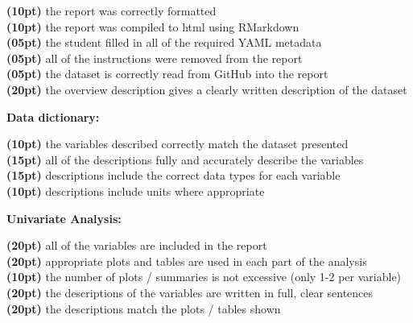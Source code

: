 \documentclass[12pt]{article}
\begin{document}
\underline{\hspace{1cm}} \textbf{(10pt)}
  the report was correctly formatted \\
\underline{\hspace{1cm}} \textbf{(10pt)}
  the report was compiled to html using RMarkdown \\
\underline{\hspace{1cm}} \textbf{(05pt)}
  the student filled in all of the required YAML metadata \\
\underline{\hspace{1cm}} \textbf{(05pt)}
  all of the instructions were removed from the report \\
\underline{\hspace{1cm}} \textbf{(05pt)}
  the dataset is correctly read from GitHub into the report \\
\underline{\hspace{1cm}} \textbf{(20pt)}
  the overview description gives a clearly written description
  of the dataset \\

\medskip

\textbf{Data dictionary:} \vspace{6pt}

\underline{\hspace{1cm}} \textbf{(10pt)}
  the variables described correctly match the dataset presented \\
\underline{\hspace{1cm}} \textbf{(15pt)}
  all of the descriptions fully and accurately describe the variables \\
\underline{\hspace{1cm}} \textbf{(15pt)}
  descriptions include the correct data types for each variable \\
\underline{\hspace{1cm}} \textbf{(10pt)}
  descriptions include units where appropriate \\

\medskip

\textbf{Univariate Analysis:} \vspace{6pt}

\underline{\hspace{1cm}} \textbf{(20pt)}
  all of the variables are included in the report \\
\underline{\hspace{1cm}} \textbf{(20pt)}
  appropriate plots and tables are used in each part of the analysis \\
\underline{\hspace{1cm}} \textbf{(10pt)}
  the number of plots / summaries is not excessive (only 1-2 per variable) \\
\underline{\hspace{1cm}} \textbf{(20pt)}
  the descriptions of the variables are written in full, clear sentences \\
\underline{\hspace{1cm}} \textbf{(20pt)}
  the descriptions match the plots / tables shown \\
\end{document}
